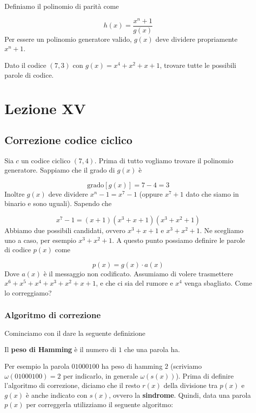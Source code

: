 \documentclass[12pt]{report}
\begin{document}
    \noindent
    Definiamo il polinomio di parità come

    $$h(x) = \frac{x^n + 1}{g(x)}$$
    Per essere un polinomio generatore valido, $g(x)$ deve dividere propriamente $x^n + 1$.

    \begin{es}
        Dato il codice $(7,3)$ con $g(x) = x^4 + x^2 + x + 1$, trovare tutte le possibili parole di codice.
    \end{es}


    \chapter{Lezione XV}

    \section{Correzione codice ciclico}

    Sia $c$ un codice ciclico $(7,4)$. Prima di tutto vogliamo trovare il polinomio generatore. Sappiamo che il grado di $g(x)$ è

    $$\text{grado}[g(x)] = 7-4 = 3$$
    Inoltre $g(x)$ deve dividere $x^n - 1 = x^7 - 1$ (oppure $x^7 + 1$ dato che siamo in binario e sono uguali). Sapendo che

    $$x^7 - 1 = (x+1) (x^3 + x + 1) (x^3 + x^2 + 1)$$
    Abbiamo due possibili candidati, ovvero $x^3 + x +1$ e $x^3 + x^2 + 1$. Ne scegliamo uno a caso, per esempio $x^3 + x^2 +1$. A questo punto possiamo definire le parole di codice $p(x)$ come

    $$p(x) = g(x) \cdot a(x)$$
    Dove $a(x)$ è il messaggio non codificato. Assumiamo di volere trasmettere $x^6 + x^5 + x^4 + x^3 + x^2 + x + 1$, e che ci sia del rumore e $x^4$ venga sbagliato. Come lo correggiamo?

    \subsection{Algoritmo di correzione}
    Cominciamo con il dare la seguente definizione

    \begin{defi}
        Il \textbf{peso di Hamming} è il numero di $1$ che una parola ha.
    \end{defi}

    \noindent
    Per esempio la parola $01000100$ ha peso di hamming $2$ (scriviamo $\omega(01000100) = 2$ per indicarlo, in generale $\omega(s(x))$). Prima di definire l'algoritmo di correzione, diciamo che il resto $r(x)$ della divisione tra $p(x)$ e $g(x)$ è anche indicato con $s(x)$, ovvero la \textbf{sindrome}.
    Quindi, data una parola $p(x)$ per correggerla utilizziamo il seguente algoritmo:
\end{document}
